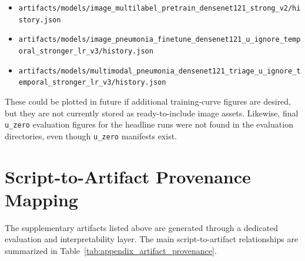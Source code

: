 \begin{itemize}
    \item \texttt{artifacts/models/image\_multilabel\_pretrain\_densenet121\_strong\_v2/history.json}
    \item \texttt{artifacts/models/image\_pneumonia\_finetune\_densenet121\_u\_ignore\_temporal\_stronger\_lr\_v3/history.json}
    \item \texttt{artifacts/models/multimodal\_pneumonia\_densenet121\_triage\_u\_ignore\_temporal\_stronger\_lr\_v3/history.json}
\end{itemize}

These could be plotted in future if additional training-curve figures are desired, but they are not currently stored as ready-to-include image assets. Likewise, final \texttt{u\_zero} evaluation figures for the headline runs were not found in the evaluation directories, even though \texttt{u\_zero} manifests exist.

\section{Script-to-Artifact Provenance Mapping}

The supplementary artifacts listed above are generated through a dedicated evaluation and interpretability layer. The main script-to-artifact relationships are summarized in Table~\ref{tab:appendix_artifact_provenance}.


